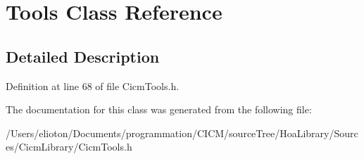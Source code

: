 \hypertarget{class_tools}{\section{Tools Class Reference}
\label{class_tools}
}


\subsection{Detailed Description}


Definition at line 68 of file Cicm\-Tools.\-h.



The documentation for this class was generated from the following file\-:\begin{DoxyCompactItemize}
\item 
/\-Users/elioton/\-Documents/programmation/\-C\-I\-C\-M/source\-Tree/\-Hoa\-Library/\-Sources/\-Cicm\-Library/Cicm\-Tools.\-h\end{DoxyCompactItemize}
